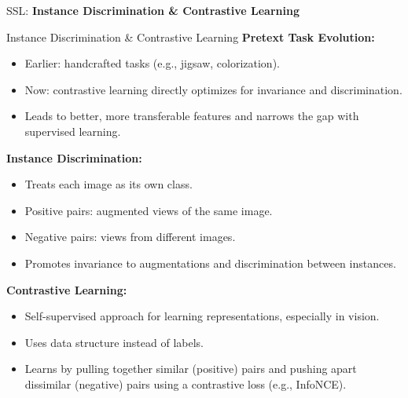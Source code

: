 \begin{frame}{}
    \LARGE SSL: \textbf{Instance Discrimination \& Contrastive Learning}
\end{frame}

\begin{frame}[t,allowframebreaks]{Instance Discrimination \& Contrastive Learning }
    \textbf{Pretext Task Evolution:}
    \begin{itemize}
        \item Earlier: handcrafted tasks (e.g., jigsaw, colorization).
        \item Now: contrastive learning directly optimizes for invariance and discrimination.
        \item Leads to better, more transferable features and narrows the gap with supervised learning.
    \end{itemize}

    \framebreak

    \textbf{Instance Discrimination:}
    \begin{itemize}
        \item Treats each image as its own class.
        \item Positive pairs: augmented views of the same image.
        \item Negative pairs: views from different images.
        \item Promotes invariance to augmentations and discrimination between instances.
    \end{itemize}

    \vspace{0.5em}

    \textbf{Contrastive Learning:}
    \begin{itemize}
        \item Self-supervised approach for learning representations, especially in vision.
        \item Uses data structure instead of labels.
        \item Learns by pulling together similar (positive) pairs and pushing apart dissimilar (negative) pairs using a contrastive loss (e.g., InfoNCE).
    \end{itemize}
\end{frame}


